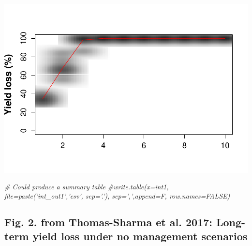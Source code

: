 \documentclass[]{article}
\newenvironment{Shaded}{\begin{snugshade}}{\end{snugshade}}
\newcommand{\CommentTok}[1]{\textcolor[rgb]{0.56,0.35,0.01}{\textit{#1}}}
\begin{document}
\includegraphics{seedHealth-v8_IITA_workshop_files/figure-latex/unnamed-chunk-2-1.pdf}

\begin{Shaded}
\begin{Highlighting}[]
\CommentTok{# Could produce a summary table}
\CommentTok{#write.table(x=int1, file=paste('int_out1','csv', sep='.'), sep=',',append=F, row.names=FALSE)}
\end{Highlighting}
\end{Shaded}

\subsection{Fig. 2. from Thomas-Sharma et al. 2017: Long-term yield loss
under no management
scenarios}\label{fig.-2.-from-thomas-sharma-et-al.-2017-long-term-yield-loss-under-no-management-scenarios}
\end{document}
